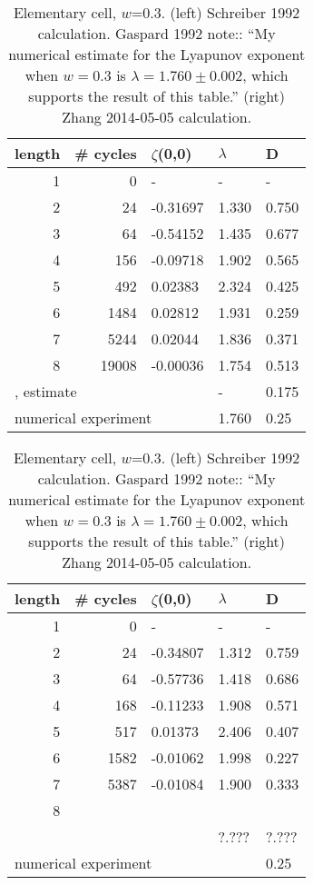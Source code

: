 \begin{description}
\begin{table}
\begin{center}
\begin{tabular}{|r|r|l|l|l|}
\hline
length & \# cycles & $\zeta$(0,0) & $\lambda$ & D \\ \hline\hline
1      & 0      &   -    &   -  &   - \\
2      & 24     & -0.31697 & 1.330 & 0.750\\
3      & 64     & -0.54152 & 1.435 & 0.677\\
4      & 156    & -0.09718 & 1.902 & 0.565\\
5      & 492    &  0.02383 & 2.324 & 0.425\\
6      & 1484   &  0.02812 & 1.931 & 0.259\\
7      & 5244   &  0.02044 & 1.836 & 0.371\\
8      & 19008  & -0.00036 & 1.754 & 0.513\\ \hline\hline
\multicolumn{3}{|l|}{{MacZwa83}, estimate}
                           &   -   & 0.175 \\
\multicolumn{3}{|l|}{numerical experiment}
                           & 1.760 & 0.25
\\ \hline
\end{tabular}
\hfill
\begin{tabular}{|r|r|l|l|l|}
\hline
length & \# cycles & $\zeta$(0,0) & $\lambda$ & D \\ \hline\hline
1      & 0      &   -    &   -  &   - \\
2      & 24     & -0.34807 & 1.312 & 0.759\\
3      & 64     & -0.57736 & 1.418 & 0.686\\
4      & 168    & -0.11233 & 1.908 & 0.571\\
5      & 517    &  0.01373 & 2.406 & 0.407\\
6      & 1582   & -0.01062 & 1.998 & 0.227\\
7      & 5387   & -0.01084 & 1.900 & 0.333\\
8      &        &          &       &       \\
\hline\hline
\multicolumn{3}{|l|}{     }& ?.??? & ?.??? \\
\multicolumn{4}{|l|}{numerical experiment} & 0.25 \\ \hline
\end{tabular}
\caption{\label{TCELL1}
Elementary cell, $w$=0.3.
(left) Schreiber 1992 calculation.
Gaspard 1992 note:: ``My numerical estimate for the Lyapunov exponent
when $w=0.3$ is $\lambda = 1.760 \pm 0.002$, which supports the result of
this table.''
(right) Zhang 2014-05-05 calculation.
}
\end{center}
\end{table}


\end{description}
